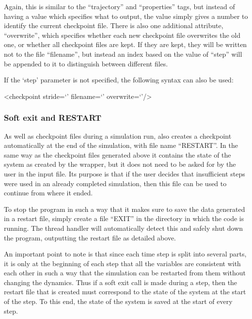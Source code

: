 \documentclass[11pt,english,fleqn]{report}
\newenvironment{code}{%
\footnotesize 
\verbatim
}{
\endverbatim
\normalsize
}
\begin{document}
Again, this is similar to the {}``trajectory'' and {}``properties''
tags, but instead of having a value which specifies what to output,
the value simply gives a number to identify the current checkpoint
file. There is also one additional attribute, {}``overwrite'', which
specifies whether each new checkpoint file overwrites the old one,
or whether all checkpoint files are kept. If they are kept, they will
be written not to the file {}``filename'', but instead an index
based on the value of {}``step'' will be appended to it to distinguish
between different files.

If the `step' parameter is not specified, the following syntax can
also be used:

\begin{code}<checkpoint stride=`' filename=`' overwrite=`'/>\end{code}


\subsubsection{Soft exit and RESTART}

As well as checkpoint files during a simulation run, \ipi{} also
creates a checkpoint automatically at the end of the simulation, with
file name {}``RESTART''. In the same way as the checkpoint files generated 
above it contains the state of the system
as created by the wrapper, but it does not need to be asked for by
the user in the input file. Its purpose is that if the user decides
that insufficient steps were used in an already completed simulation,
then this file can be used to continue from where it ended.

To stop the program in such a way that it makes sure to save the data
generated in a restart file, simply create a file {}``EXIT'' in
the directory in which the code is running. The thread handler will
automatically detect this and safely shut down the program, outputting
the restart file as detailed above. 

An important point to note is that since each time step is split into
several parts, it is only at the beginning of each step that all the
variables are consistent with each other in such a way that the simulation
can be restarted from them without changing the dynamics. Thus if
a soft exit call is made during a step, then the restart file that
is created must correspond to the state of the system at the start
of the step. To this end, the state of the system is saved at the
start of every step.
\end{document}
